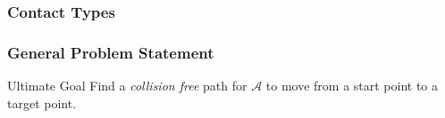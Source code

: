 \documentclass[ucs,9pt,pagenumbersfull]{beamer}
\begin{document}
\begin{frame}
  \frametitle{Contact Types}
  \begin{minipage}{0.4\linewidth}
    \begin{overlayarea}{\textwidth}{0.6\textheight}

    \end{overlayarea}
  \end{minipage}
  \hfill
  \begin{minipage}{0.55\linewidth}
    \begin{center}
      
    \end{center}
  \end{minipage}
\end{frame}

\begin{frame}
  \frametitle{General Problem Statement}
  \begin{block}{Ultimate Goal}
    Find a \emph{collision free} path for \(\mathcal{A}\) to move from a start point to a
    target point.
  \end{block}

  \begin{figure}
    \centering
    
  \end{figure}
\end{frame}
\end{document}
